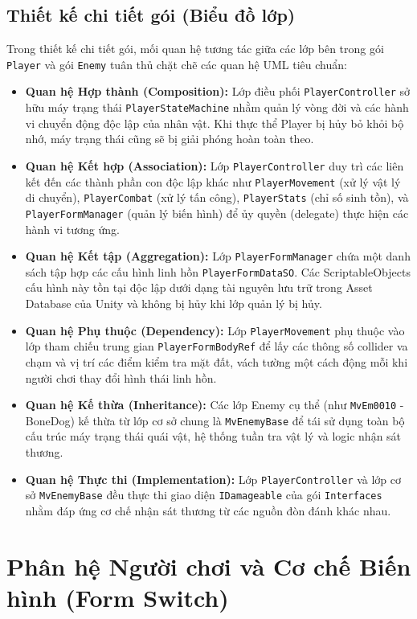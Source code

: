 \documentclass[../DoAn.tex]{subfiles}
\begin{document}
\subsection{Thiết kế chi tiết gói (Biểu đồ lớp)}
\label{subsection:4.1.3}
Trong thiết kế chi tiết gói, mối quan hệ tương tác giữa các lớp bên trong gói \texttt{Player} và gói \texttt{Enemy} tuân thủ chặt chẽ các quan hệ UML tiêu chuẩn:
\begin{itemize}
    \item \textbf{Quan hệ Hợp thành (Composition):} Lớp điều phối \texttt{PlayerController} sở hữu máy trạng thái \texttt{PlayerStateMachine} nhằm quản lý vòng đời và các hành vi chuyển động độc lập của nhân vật. Khi thực thể Player bị hủy bỏ khỏi bộ nhớ, máy trạng thái cũng sẽ bị giải phóng hoàn toàn theo.
    \item \textbf{Quan hệ Kết hợp (Association):} Lớp \texttt{PlayerController} duy trì các liên kết đến các thành phần con độc lập khác như \texttt{PlayerMovement} (xử lý vật lý di chuyển), \texttt{PlayerCombat} (xử lý tấn công), \texttt{PlayerStats} (chỉ số sinh tồn), và \texttt{PlayerFormManager} (quản lý biến hình) để ủy quyền (delegate) thực hiện các hành vi tương ứng.
    \item \textbf{Quan hệ Kết tập (Aggregation):} Lớp \texttt{PlayerFormManager} chứa một danh sách tập hợp các cấu hình linh hồn \texttt{PlayerFormDataSO}. Các ScriptableObjects cấu hình này tồn tại độc lập dưới dạng tài nguyên lưu trữ trong Asset Database của Unity và không bị hủy khi lớp quản lý bị hủy.
    \item \textbf{Quan hệ Phụ thuộc (Dependency):} Lớp \texttt{PlayerMovement} phụ thuộc vào lớp tham chiếu trung gian \texttt{PlayerFormBodyRef} để lấy các thông số collider va chạm và vị trí các điểm kiểm tra mặt đất, vách tường một cách động mỗi khi người chơi thay đổi hình thái linh hồn.
    \item \textbf{Quan hệ Kế thừa (Inheritance):} Các lớp Enemy cụ thể (như \texttt{MvEm0010} - BoneDog) kế thừa từ lớp cơ sở chung là \texttt{MvEnemyBase} để tái sử dụng toàn bộ cấu trúc máy trạng thái quái vật, hệ thống tuần tra vật lý và logic nhận sát thương.
    \item \textbf{Quan hệ Thực thi (Implementation):} Lớp \texttt{PlayerController} và lớp cơ sở \texttt{MvEnemyBase} đều thực thi giao diện \texttt{IDamageable} của gói \texttt{Interfaces} nhằm đáp ứng cơ chế nhận sát thương từ các nguồn đòn đánh khác nhau.
\end{itemize}


\section{Phân hệ Người chơi và Cơ chế Biến hình (Form Switch)}
\label{section:4.2}
\end{document}
